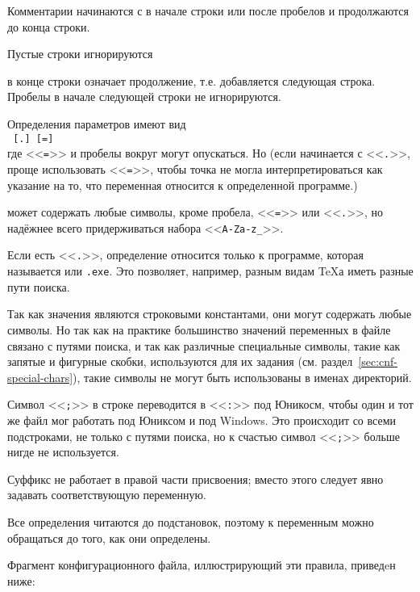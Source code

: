 \documentclass{article}
\renewcommand{\samp}[1]{<<\texttt{#1}>>}
\begin{document}
\begin{itemize*}
\item 
  Комментарии начинаются с \code{\%} в начале строки или после
  пробелов и продолжаются до конца строки.
\item 
  Пустые строки игнорируются
\item
   \bs{} в конце строки означает продолжение, т.е. добавляется
   следующая строка.  Пробелы в начале следующей строки не
   игнорируются. 
\item 
   Определения параметров имеют вид\\
   \hspace*{2em}\texttt{ \textrm{[}.\textrm{]}
   \textrm{[}=\textrm{]} }\\[1pt]
  где \samp{=} и пробелы вокруг могут опускаться.  Но (если 
   начинается с \samp{.}, проще использовать 
  \samp{=}, чтобы точка не могла интерпретироваться как указание на
  то, что переменная относится к определенной программе.)

\item 
   может содержать любые символы, кроме пробела,
  \samp{=} или  \samp{.}, но надёжнее всего придерживаться набора
  \samp{A-Za-z\_}.
\item 
  Если есть \samp{.}, определение относится только к
  программе, которая называется
  \texttt{} или \texttt{.exe}.  Это
  позволяет, например, разным видам  \TeX{}а иметь разные пути поиска. 
\item Так как значения  являются строковыми константами,
  они могут содержать любые символы. Но так как на практике
  большинство значений переменных в файле   связано с
  путями поиска, и так как различные специальные символы, такие как
  запятые и фигурные скобки, используются
  для их задания (см. раздел~\ref{sec:cnf-special-chars}), такие
  символы не могут быть использованы в именах директорий.
  

  Символ \samp{;} в строке  переводится в \samp{:} под
  Юникосм, чтобы один и тот же файл  мог работать под
  Юниксом и под Windows.  Это происходит со всеми подстроками, не
  только с путями поиска, но к счастью символ \samp{;} больше нигде
  не используется.
  
  Суффикс  не работает в правой части
  присвоения;  вместо этого следует явно задавать соответствующую
  переменную.  
   
\item 
  Все определения читаются до подстановок, поэтому к переменным можно
  обращаться до того, как они определены. 
\end{itemize*}
Фрагмент конфигурационного файла, иллюстрирующий эти правила, приведeн 
\ifSingleColumn
ниже:
\end{document}
